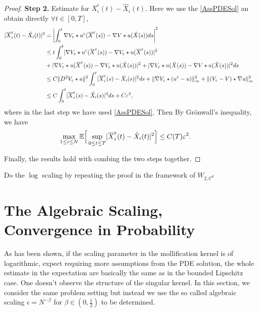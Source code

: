 \begin{proof}
{\bf Step 2.} Estimate for $\overline{X}_i^{\epsilon}(t) - \hat{X}_i(t)   $. Here we use the \autoref{AssPDESol} an obtain directly $\forall t\in [0,T]$,
\begin{align*}
  \abs{\overline{X}_i^{\epsilon}(t) - \hat{X}_i(t)    }^2 &= \abs*{\int_0^{t} \nabla V_{\epsilon} \star  u^{\epsilon}(\overline{X}^{\epsilon} (s))- \nabla V  \star  u(\hat{X}(s)  ) ds }^2\\
                &\le t \int_0^{t} \abs{\nabla V_\epsilon \star  u^{\epsilon}(\overline{X}^{\epsilon}(s)  ) - \nabla V_{\epsilon} \star  u(\overline{X}^{\epsilon}(s)  ) }^2  \\
                 &+ \abs{\nabla V_\epsilon \star  u(\overline{X}^{\epsilon}(s)  ) - \nabla V_{\epsilon} \star  u(\hat{X}(s)  )}^2   + \abs{\nabla V_\epsilon \star u(\hat{X}(s)  ) - \nabla V \star  u(\hat{X}(s)  )}^2 ds\\
                &\le C\|D^2 V_\epsilon \star  u\|^2 \int_0^{t} \abs{\overline{X}_i^{\epsilon}(s) - \hat{X}_i(s) }^2 ds +\|\nabla V_\epsilon \star (u^{\epsilon}-u )\|^2_{\infty}+ \|(V_\epsilon - V) \star  \nabla u\|_{\infty}^2\\
                &\le C\int_0^{t} \abs{\overline{X}_i^{\epsilon}(s) - \hat{X}_i(s) }^2 ds +C \epsilon^2,
\end{align*}
where in the last step we have used \autoref{AssPDESol}.
Then By Grönwall's inequality, we have
\begin{align}\label{barhat}
  \max_{1 \le i \le N}\E\Big[\sup_{0\leq t\leq T}\abs{\overline{X}_i^{\epsilon}(t) - \hat{X}_i(t)    }^2\Big] &\le C(T) \epsilon^2
.\end{align}

Finally, the results hold with combing the two steps together.
\end{proof}
\begin{exercise}
 Do the $\log$ scaling by repeating  the proof in the framework of $ W_{2,\mathcal{C}^{d} }$
\end{exercise}


\section{The Algebraic Scaling, Convergence in Probability}

As has been shown, if the scaling parameter in the mollification kernel is of logarithmic, expect requiring more assumptions from the PDE solution, the whole estimate in the expectation are basically the same as in the bounded Lipschitz case. One doesn't observe the structure of the singular kernel. In this section, we consider the same problem setting but instead we use the so called algebraic scaling $\epsilon = N^{-\beta } $ for $\beta  \in  (0,\frac{1}{2})$ to be determined.
\vskip3mm

